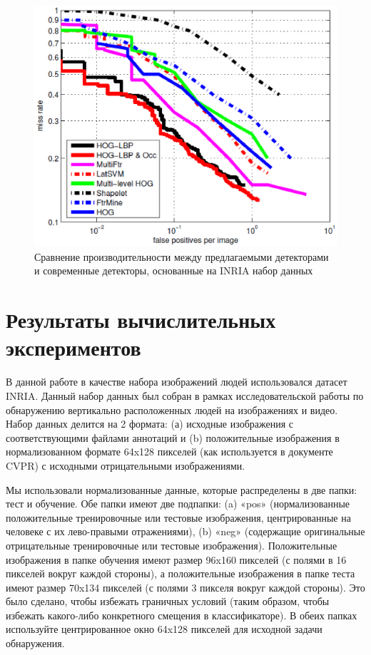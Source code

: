 \documentclass[12pt,twoside]{article}
\begin{document}
\begin{figure}[H]
	\includegraphics[width=1\textwidth]{Wang2}
	\caption{Сравнение производительности между предлагаемыми детекторами и современные детекторы, основанные на INRIA набор данных}
	\label{fg:HOG}
\end{figure}

\section{Результаты вычислительных экспериментов}
В данной работе в качестве набора изображений людей использовался датасет INRIA\cite{inria}. Данный набор данных был собран в рамках исследовательской работы по обнаружению вертикально расположенных людей на изображениях и видео\cite{dalaltriggs2005}. Набор данных делится на 2 формата: (а) исходные изображения с соответствующими файлами аннотаций и (b) положительные изображения в нормализованном формате 64x128 пикселей (как используется в документе CVPR) с исходными отрицательными изображениями.

Мы использовали нормализованные данные, которые распределены в две папки: тест и обучение. Обе папки имеют две подпапки: (a) «pos» (нормализованные положительные тренировочные или тестовые изображения, центрированные на человеке с их лево-правыми отражениями), (b) «neg» (содержащие оригинальные отрицательные тренировочные или тестовые изображения). Положительные изображения в папке обучения имеют размер 96x160 пикселей (с полями в 16 пикселей вокруг каждой стороны), а положительные изображения в папке теста имеют размер 70x134 пикселей (с полями 3 пикселя вокруг каждой стороны). Это было сделано, чтобы избежать граничных условий (таким образом, чтобы избежать какого-либо конкретного смещения в классификаторе). В обеих папках используйте центрированное окно 64x128 пикселей для исходной задачи обнаружения.
\end{document}
